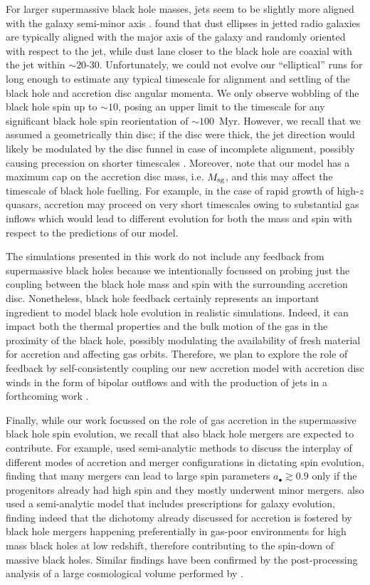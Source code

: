 \documentclass[a4paper,fleqn,usenatbib]{mnras}
\begin{document}
For larger supermassive black hole masses, jets seem to be slightly more aligned with the galaxy semi-minor axis \citep{schmitt+02}.
\citet{verdoeskleijn+05} found that dust ellipses in jetted radio galaxies are typically aligned with the major axis of the galaxy and randomly oriented with respect to the jet, while dust lane closer to the black hole are coaxial with the jet within $\sim 20$-30\degr.
Unfortunately, we could not evolve our ``elliptical'' runs for long enough to estimate any typical timescale for alignment and settling of the black hole and accretion disc angular momenta.
We only observe wobbling of the black hole spin up to $\sim 10$\degr, posing an upper limit to the timescale for any significant black hole spin reorientation of $\sim 100$~Myr.
However, we recall that we assumed a geometrically thin disc; if the disc were thick, the jet direction would likely be modulated by the disc funnel in case of incomplete alignment, possibly causing precession on shorter timescales \citep{liska+17}.
Moreover, note that our model has a maximum cap on the accretion disc mass, i.e. $M_{\rm sg}$, and this may affect the timescale of black hole fuelling.
For example, in the case of rapid growth of high-$z$ quasars, accretion may proceed on very short timescales owing to substantial gas inflows which would lead to different evolution for both the mass and spin with respect to the predictions of our model.

The simulations presented in this work do not include any feedback from supermassive black holes because we intentionally focussed on probing just the coupling between the black hole mass and spin with the surrounding accretion disc.
Nonetheless, black hole feedback certainly represents an important ingredient to model black hole evolution in realistic simulations.
Indeed, it can impact both the thermal properties and the bulk motion of the gas in the proximity of the black hole, possibly modulating the availability of fresh material for accretion and affecting gas orbits.
Therefore, we plan to explore the role of feedback by self-consistently coupling our new accretion model with accretion disc winds in the form of bipolar outflows and with the production of jets in a forthcoming work \citep{curtis+16a,bourne+17}.

Finally, while our work focussed on the role of gas accretion in the supermassive black hole spin evolution, we recall that also black hole mergers are expected to contribute.
For example, \citet{berti+08} used semi-analytic methods to discuss the interplay of different modes of accretion and merger configurations in dictating spin evolution, finding that many mergers can lead to large spin parameters $a_{\bullet} \gtrsim 0.9$ only if the progenitors already had high spin and they mostly underwent minor mergers.
\citet{barausse+12} also used a semi-analytic model that includes prescriptions for galaxy evolution, finding indeed that the dichotomy already discussed for accretion is fostered by black hole mergers happening preferentially in gas-poor environments for high mass black holes at low redshift, therefore contributing to the spin-down of massive black holes.
Similar findings have been confirmed by the post-processing analysis of a large cosmological volume performed by \citet{dubois+14a}.
\end{document}

